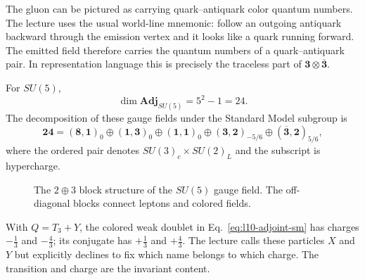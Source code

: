 The gluon can be pictured as carrying quark--antiquark color quantum numbers. The lecture uses the usual world-line mnemonic: follow an outgoing antiquark backward through the emission vertex and it looks like a quark running forward. The emitted field therefore carries the quantum numbers of a quark--antiquark pair. In representation language this is precisely the traceless part of \(\mathbf3\otimes\overline{\mathbf3}\).

For \(SU(5)\),
\begin{equation}
\dim\mathbf{Adj}_{SU(5)}=5^2-1=24.
\end{equation}
The decomposition of these gauge fields under the Standard Model subgroup is
\begin{equation}
\mathbf{24}
=
(\mathbf8,\mathbf1)_0
\oplus(\mathbf1,\mathbf3)_0
\oplus(\mathbf1,\mathbf1)_0
\oplus(\mathbf3,\mathbf2)_{-5/6}
\oplus(\overline{\mathbf3},\mathbf2)_{5/6},
\label{eq:l10-adjoint-sm}
\end{equation}
where the ordered pair denotes \(SU(3)_c\times SU(2)_L\) and the subscript is hypercharge.


\begin{figure}[htbp]
\centering
{}
\caption{The \(2\oplus3\) block structure of the \(SU(5)\) gauge field. The off-diagonal blocks connect leptons and colored fields.}
\label{fig:l10-gauge-blocks}
\end{figure}

With \(Q=T_3+Y\), the colored weak doublet in Eq.~\eqref{eq:l10-adjoint-sm} has charges \(-\tfrac13\) and \(-\tfrac43\); its conjugate has \(+\tfrac13\) and \(+\tfrac43\). The lecture calls these particles \(X\) and \(Y\) but explicitly declines to fix which name belongs to which charge. The transition and charge are the invariant content.

